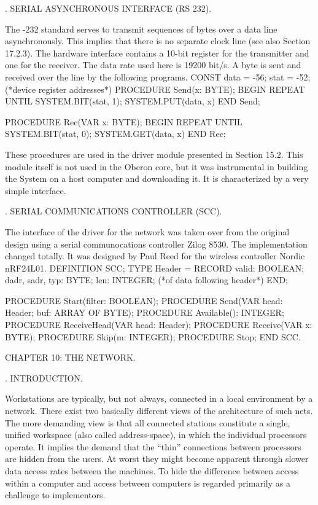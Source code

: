 . SERIAL ASYNCHRONOUS INTERFACE (RS 232).

The -232 standard serves to transmit sequences of bytes over a data line asynchronously. This implies that there is no separate clock line (see also Section 17.2.3). The hardware interface contains a 10-bit register for the transmitter and one for the receiver. The data rate used here is 19200 bit/s. A byte is sent and received over the line by the following programs.
\begintt
CONST data = -56; stat = -52; (*device register addresses*)
PROCEDURE Send(x: BYTE);
BEGIN
  REPEAT UNTIL SYSTEM.BIT(stat, 1);
  SYSTEM.PUT(data, x)
END Send;

PROCEDURE Rec(VAR x: BYTE);
BEGIN
  REPEAT UNTIL SYSTEM.BIT(stat, 0);
  SYSTEM.GET(data, x)
END Rec;
\endtt

\noindent These procedures are used in the driver module  presented in Section 15.2. This module itself is not used in the Oberon core, but it was instrumental in building the System on a host computer and downloading it. It is characterized by a very simple interface.

. SERIAL COMMUNICATIONS CONTROLLER (SCC).

The interface of the driver for the network was taken over from the original design using a serial communocations controller Zilog 8530. The implementation changed totally. It was designed by Paul Reed for the wireless controller Nordic nRF24L01.
\begintt
DEFINITION SCC;
TYPE Header =
  RECORD valid: BOOLEAN; dadr, sadr, typ: BYTE;
    len: INTEGER; (*of data following header*)
  END;
  
PROCEDURE Start(filter: BOOLEAN);
PROCEDURE Send(VAR head: Header; buf: ARRAY OF BYTE);
PROCEDURE Available(): INTEGER;
PROCEDURE ReceiveHead(VAR head: Header);
PROCEDURE Receive(VAR x: BYTE);
PROCEDURE Skip(m: INTEGER);
PROCEDURE Stop;
END SCC.
\endtt

\beginchapter CHAPTER 10: THE NETWORK.

. INTRODUCTION.

Workstations are typically, but not always, connected in a local environment by a network. There exist two basically different views of the architecture of such nets. The more demanding view is that all connected stations constitute a single, unified workspace (also called address-space), in which the individual processors operate. It implies the demand that the ``thin'' connections between processors are hidden from the users. At worst they might become apparent through slower data access rates between the machines. To hide the difference between access within a computer and access between computers is regarded primarily as a challenge to implementors.

